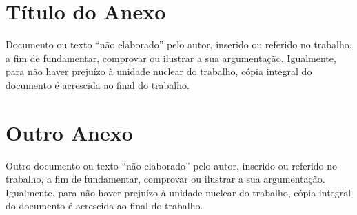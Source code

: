 \documentclass{unemat-tex}
\begin{document}
\begin{anexosenv}
	
	\partanexos
	
	\chapter{Título do Anexo}
	
		Documento ou texto “não elaborado”	pelo autor, inserido ou referido no trabalho, a fim de fundamentar, comprovar ou ilustrar a sua argumentação. Igualmente, para não haver prejuízo à unidade nuclear do trabalho, cópia integral do documento é acrescida ao final do trabalho.
		
	\chapter{Outro Anexo}
	
		Outro documento ou texto “não elaborado”	pelo autor, inserido ou referido no trabalho, a fim de fundamentar, comprovar ou ilustrar a sua argumentação. Igualmente, para não haver prejuízo à unidade nuclear do trabalho, cópia integral do documento é acrescida ao final do trabalho.
	
\end{anexosenv}
\end{document}
